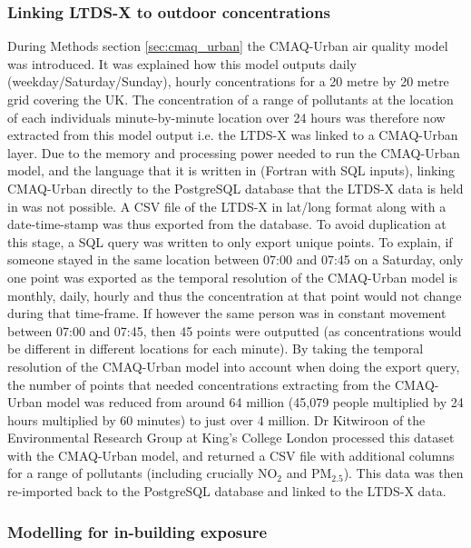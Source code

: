         \subsubsection{Linking LTDS-X to outdoor concentrations}
        \label{sec:linking_ltdsx_to_cmaq}

During Methods section \ref{sec:cmaq_urban} the CMAQ-Urban air quality model was introduced. It was explained how this model outputs daily (weekday/Saturday/Sunday), hourly concentrations for a 20 metre by 20 metre grid covering the UK. The concentration of a range of pollutants at the location of each individuals minute-by-minute location over 24 hours was therefore now extracted from this model output i.e. the LTDS-X was linked to a CMAQ-Urban layer. Due to the memory and processing power needed to run the CMAQ-Urban model, and the language that it is written in (Fortran with SQL inputs), linking CMAQ-Urban directly to the PostgreSQL database that the LTDS-X data is held in was not possible. A CSV file of the LTDS-X in lat/long format along with a date-time-stamp was thus exported from the database. To avoid duplication at this stage, a SQL query was written to only export unique points. To explain, if someone stayed in the same location between 07:00 and 07:45 on a Saturday, only one point was exported as the temporal resolution of the CMAQ-Urban model is monthly, daily, hourly and thus the concentration at that point would not change during that time-frame. If however the same person was in constant movement between 07:00 and 07:45, then 45 points were outputted (as concentrations would be different in different locations for each minute). By taking the temporal resolution of the CMAQ-Urban model into account when doing the export query, the number of points that needed concentrations extracting from the CMAQ-Urban model was reduced from around 64 million (45,079 people multiplied by 24 hours multiplied by 60 minutes) to just over 4 million. Dr Kitwiroon of the Environmental Research Group at King's College London processed this dataset with the CMAQ-Urban model, and returned a CSV file with additional columns for a range of pollutants (including crucially NO$_{2}$ and PM$_{2.5}$). This data was then re-imported back to the PostgreSQL database and linked to the LTDS-X data.

        \subsubsection{Modelling for in-building exposure}
        \label{sec:modelling_in_building}

